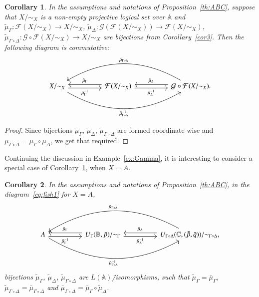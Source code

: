 \documentclass[12pt]{article}
\newtheorem{corollary}{Corollary}
\theoremstyle{definition}
\def\MA{{\mathbb{A}}}
\def\MB{{\mathbb{B}}}
\def\MC{{\mathbb{C}}}
\def\F{{\mathcal{F}}}
\def\G{{\mathcal{G}}}
\begin{document}
\begin{corollary}\label{cor16}
In the assumptions and notations of Proposition~\ref{th:ABC}, suppose that $X/{\sim_X}$ is a non-empty projective logical set over $\MA$ and $\tilde\mu_{\Gamma}\colon \F(X/{\sim_X})\to X/{\sim_X}$, $\tilde\mu_{\Delta}\colon \G(\F(X/{\sim_X}))\to \F(X/{\sim_X})$, $\tilde\mu_{\Gamma\circ\Delta}\colon \G\circ\F(X/{\sim_X})\to X/{\sim_X}$ are bijections from Corollary~\ref{cor3}. Then the following diagram is commutative:
\begin{equation}\label{eq:fish1}
\begin{tikzcd}[column sep=huge,
row sep=huge]
X/{\sim_X} 
\ar[rr, "\tilde\mu_{\Gamma\circ\Delta}^{-1}"', bend right=30] 
\ar[r,shift right, "\tilde\mu_\Gamma^{-1}"']
& \F(X/{\sim_X}) 
\ar[l,shift right, "\tilde\mu_\Gamma"'] 
\ar[r,shift right, "\tilde\mu_\Delta^{-1}"']
& \G\circ\F(X/{\sim_X}) 
\ar[l,shift right, "\tilde\mu_\Delta"']
\ar[ll, "\tilde\mu_{\Gamma\circ\Delta}"', bend right=30].
\end{tikzcd}
\end{equation}
\end{corollary}

\begin{proof}
Since bijections $\tilde\mu_{\Gamma}$, $\tilde\mu_{\Delta}$, $\tilde\mu_{\Gamma\circ\Delta}$ are formed coordinate-wise and $\mu_{\Gamma\circ\Delta}=\mu_\Gamma\circ\mu_\Delta$, we get that required. 
\end{proof}

Continuing the discussion in Example~\ref{ex:Gamma}, it is interesting to consider a special case
of Corollary~\ref{cor16}, when $X=A$.

\begin{corollary}\label{ex:Gamma_Delta}
In the assumptions and notations of Proposition~\ref{th:ABC}, in the diagram~\ref{eq:fish1} for $X=A$,
\begin{equation*}
\begin{tikzcd}[column sep=huge,
row sep=huge]
A 
\ar[rr, "\tilde\mu_{\Gamma\circ\Delta}^{-1}"', bend right=30] 
\ar[r,shift right, "\tilde\mu_\Gamma^{-1}"']
& U_\Gamma(\MB,\bar p)/{\sim_\Gamma} 
\ar[l,shift right, "\tilde\mu_\Gamma"'] 
\ar[r,shift right, "\tilde\mu_\Delta^{-1}"']
& U_{\Gamma\circ\Delta}(\MC,(\bar{\bar p},\bar q))/{\sim_{\Gamma\circ\Delta}} 
\ar[l,shift right, "\tilde\mu_\Delta"']
\ar[ll, "\tilde\mu_{\Gamma\circ\Delta}"', bend right=30],
\end{tikzcd}
\end{equation*}
bijections $\tilde \mu_\Gamma$, $\tilde\mu_\Delta$, $\tilde\mu_{\Gamma\circ\Delta}$ are $L(\MA)$\=/isomorphisms, such that $\tilde\mu_\Gamma=\bar\mu_\Gamma$, $\tilde\mu_{\Gamma\circ\Delta}=\bar\mu_{\Gamma\circ\Delta}$ and $\bar\mu_{\Gamma\circ\Delta}=\bar\mu_\Gamma\circ\tilde\mu_\Delta$.
\end{corollary}
\end{document}
